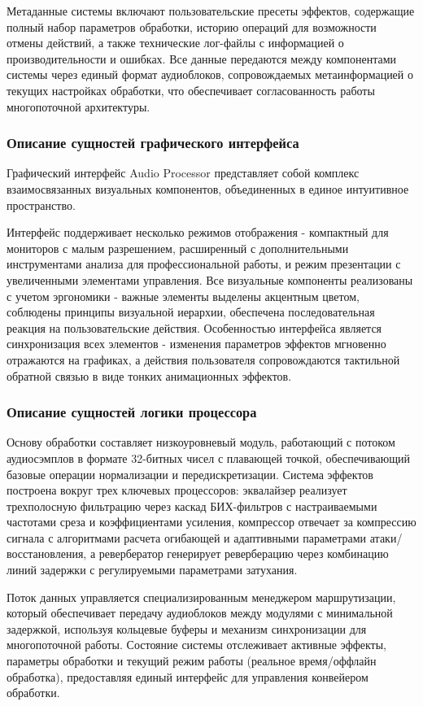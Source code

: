 Метаданные системы включают пользовательские пресеты эффектов, содержащие полный набор параметров обработки, историю операций для возможности отмены действий, а также технические лог-файлы с информацией о производительности и ошибках. Все данные передаются между компонентами системы через единый формат аудиоблоков, сопровождаемых метаинформацией о текущих настройках обработки, что обеспечивает согласованность работы многопоточной архитектуры.

\subsubsection{Описание сущностей графического интерфейса}

Графический интерфейс Audio Processor представляет собой комплекс взаимосвязанных визуальных компонентов, объединенных в единое интуитивное пространство. 

Интерфейс поддерживает несколько режимов отображения - компактный для мониторов с малым разрешением, расширенный с дополнительными инструментами анализа для профессиональной работы, и режим презентации с увеличенными элементами управления. Все визуальные компоненты реализованы с учетом эргономики - важные элементы выделены акцентным цветом, соблюдены принципы визуальной иерархии, обеспечена последовательная реакция на пользовательские действия. Особенностью интерфейса является синхронизация всех элементов - изменения параметров эффектов мгновенно отражаются на графиках, а действия пользователя сопровождаются тактильной обратной связью в виде тонких анимационных эффектов.

\subsubsection{Описание сущностей логики процессора}

Основу обработки составляет низкоуровневый модуль, работающий с потоком аудиосэмплов в формате 32-битных чисел с плавающей точкой, обеспечивающий базовые операции нормализации и передискретизации. Система эффектов построена вокруг трех ключевых процессоров: эквалайзер реализует трехполосную фильтрацию через каскад БИХ-фильтров с настраиваемыми частотами среза и коэффициентами усиления, компрессор отвечает за компрессию сигнала с алгоритмами расчета огибающей и адаптивными параметрами атаки/восстановления, а ревербератор генерирует реверберацию через комбинацию линий задержки с регулируемыми параметрами затухания.

Поток данных управляется специализированным менеджером маршрутизации, который обеспечивает передачу аудиоблоков между модулями с минимальной задержкой, используя кольцевые буферы и механизм синхронизации для многопоточной работы. Состояние системы отслеживает активные эффекты, параметры обработки и текущий режим работы (реальное время/оффлайн обработка), предоставляя единый интерфейс для управления конвейером обработки. 

